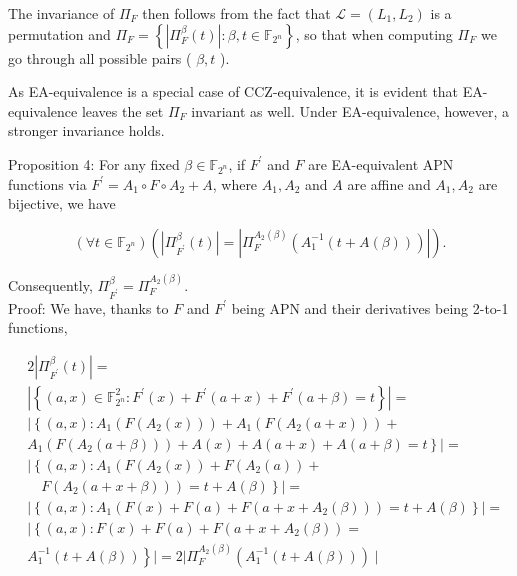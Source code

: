 \documentclass[10pt]{article}
\begin{document}
The invariance of $\Pi_{F}$ then follows from the fact that $\mathcal{L}= \left(L_{1}, L_{2}\right)$ is a permutation and $\Pi_{F}=\left\{\left|\Pi_{F}^{\beta}(t)\right|: \beta, t \in \mathbb{F}_{2^{n}}\right\}$, so that when computing $\Pi_{F}$ we go through all possible pairs ( $\beta, t$ ).

As EA-equivalence is a special case of CCZ-equivalence, it is evident that EA-equivalence leaves the set $\Pi_{F}$ invariant as well. Under EA-equivalence, however, a stronger invariance holds.

Proposition 4: For any fixed $\beta \in \mathbb{F}_{2^{n}}$, if $F^{\prime}$ and $F$ are EA-equivalent APN functions via $F^{\prime}=A_{1} \circ F \circ A_{2}+A$, where $A_{1}, A_{2}$ and $A$ are affine and $A_{1}, A_{2}$ are bijective, we have

$$
\left(\forall t \in \mathbb{F}_{2^{n}}\right)\left(\left|\Pi_{F^{\prime}}^{\beta}(t)\right|=\left|\Pi_{F}^{A_{2}(\beta)}\left(A_{1}^{-1}(t+A(\beta))\right)\right|\right) .
$$

Consequently, $\Pi_{F^{\prime}}^{\beta}=\Pi_{F}^{A_{2}(\beta)}$.\\
Proof: We have, thanks to $F$ and $F^{\prime}$ being APN and their derivatives being 2-to-1 functions,


\begin{align*}
& 2\left|\Pi_{F^{\prime}}^{\beta}(t)\right|= \\
& \left|\left\{(a, x) \in \mathbb{F}_{2^{n}}^{2}: F^{\prime}(x)+F^{\prime}(a+x)+F^{\prime}(a+\beta)=t\right\}\right|= \\
& \mid\left\{(a, x): A_{1}\left(F\left(A_{2}(x)\right)\right)+A_{1}\left(F\left(A_{2}(a+x)\right)\right)+\right. \\
& \left.A_{1}\left(F\left(A_{2}(a+\beta)\right)\right)+A(x)+A(a+x)+A(a+\beta)=t\right\} \mid= \\
& \mid\left\{(a, x): A_{1}\left(F\left(A_{2}(x)\right)+F\left(A_{2}(a)\right)+\right.\right. \\
& \left.\left.\quad F\left(A_{2}(a+x+\beta)\right)\right)=t+A(\beta)\right\} \mid= \\
& \left|\left\{(a, x): A_{1}\left(F(x)+F(a)+F\left(a+x+A_{2}(\beta)\right)\right)=t+A(\beta)\right\}\right|= \\
& \mid\left\{(a, x): F(x)+F(a)+F\left(a+x+A_{2}(\beta)\right)=\right. \\
& \left.A_{1}^{-1}(t+A(\beta))\right\}|=2| \Pi_{F}^{A_{2}(\beta)}\left(A_{1}^{-1}(t+A(\beta))\right) \mid \tag{7}
\end{align*}
\end{document}
